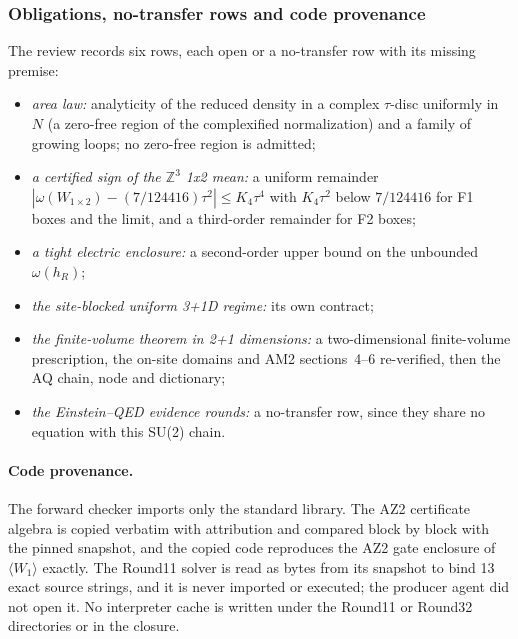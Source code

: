 \subsubsection{Obligations, no-transfer rows and code provenance}
\label{sec:bd2-obligations}
The review records six rows, each open or a no-transfer row with its missing
premise:
\begin{itemize}
\item \emph{area law:} analyticity of the reduced density in a complex
 $\tau$-disc uniformly in $N$ (a zero-free region of the complexified
 normalization) and a family of growing loops; no zero-free region is
 admitted;
\item \emph{a certified sign of the $\mathbb Z^3$ 1x2 mean:} a uniform remainder
 $|\omega(W_{1\times2})-(7/124416)\tau^2|\le K_4\tau^4$ with $K_4\tau^2$ below
 $7/124416$ for F1 boxes and the limit, and a third-order remainder for F2
 boxes;
\item \emph{a tight electric enclosure:} a second-order upper bound on the
 unbounded $\omega(h_R)$;
\item \emph{the site-blocked uniform 3+1D regime:} its own contract;
\item \emph{the finite-volume theorem in 2+1 dimensions:} a two-dimensional
 finite-volume prescription, the on-site domains and AM2 sections~4--6
 re-verified, then the AQ chain, node and dictionary;
\item \emph{the Einstein--QED evidence rounds:} a no-transfer row, since they
 share no equation with this SU(2) chain.
\end{itemize}

\paragraph{Code provenance.} The forward checker imports only the standard
library. The AZ2 certificate algebra is copied verbatim with attribution and
compared block by block with the pinned snapshot, and the copied code
reproduces the AZ2 gate enclosure of $\langle W_1\rangle$ exactly. The Round11
solver is read as bytes from its snapshot to bind 13 exact source strings,
and it is never imported or executed; the producer agent did not open it.
No interpreter cache is written under the Round11 or Round32 directories or
in the closure.

